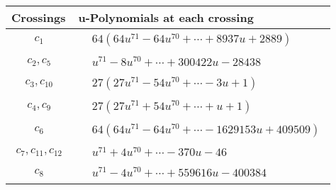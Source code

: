 \documentclass[1p]{elsarticle_modified}
\theoremstyle{definition}
\begin{document}
\begin{tabular}{m{50pt}|m{274pt}}
Crossings & \hspace{64pt}u-Polynomials at each crossing \\
\hline $$\begin{aligned}c_{1}\end{aligned}$$&$\begin{aligned}
&64(64 u^{71}-64 u^{70}+\cdots+8937 u+2889)
\end{aligned}$\\
\hline $$\begin{aligned}c_{2},c_{5}\end{aligned}$$&$\begin{aligned}
&u^{71}-8 u^{70}+\cdots+300422 u-28438
\end{aligned}$\\
\hline $$\begin{aligned}c_{3},c_{10}\end{aligned}$$&$\begin{aligned}
&27(27 u^{71}-54 u^{70}+\cdots-3 u+1)
\end{aligned}$\\
\hline $$\begin{aligned}c_{4},c_{9}\end{aligned}$$&$\begin{aligned}
&27(27 u^{71}+54 u^{70}+\cdots+u+1)
\end{aligned}$\\
\hline $$\begin{aligned}c_{6}\end{aligned}$$&$\begin{aligned}
&64(64 u^{71}-64 u^{70}+\cdots-1629153 u+409509)
\end{aligned}$\\
\hline $$\begin{aligned}c_{7},c_{11},c_{12}\end{aligned}$$&$\begin{aligned}
&u^{71}+4 u^{70}+\cdots-370 u-46
\end{aligned}$\\
\hline $$\begin{aligned}c_{8}\end{aligned}$$&$\begin{aligned}
&u^{71}-4 u^{70}+\cdots+559616 u-400384
\end{aligned}$\\
\hline
\end{tabular}\\~\\
\end{document}
